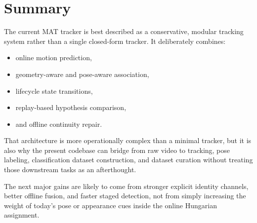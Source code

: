 \documentclass[11pt]{article}
\begin{document}
\section{Summary}

The current MAT tracker is best described as a conservative, modular tracking system rather than a single closed-form tracker. It deliberately combines:

\begin{itemize}
  \item online motion prediction,
  \item geometry-aware and pose-aware association,
  \item lifecycle state transitions,
  \item replay-based hypothesis comparison,
  \item and offline continuity repair.
\end{itemize}

That architecture is more operationally complex than a minimal tracker, but it is also why the present codebase can bridge from raw video to tracking, pose labeling, classification dataset construction, and dataset curation without treating those downstream tasks as an afterthought.

The next major gains are likely to come from stronger explicit identity channels, better offline fusion, and faster staged detection, not from simply increasing the weight of today's pose or appearance cues inside the online Hungarian assignment.
\end{document}
